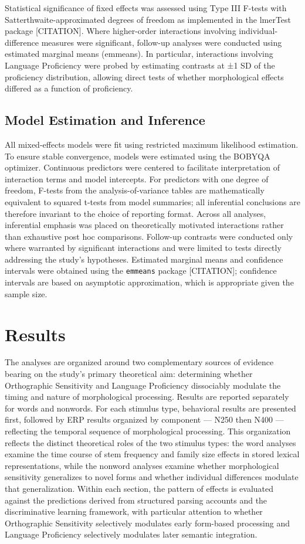 \documentclass[utf8]{FrontiersinHarvard} %
\begin{document}
Statistical significance of fixed effects was assessed using Type III F-tests with Satterthwaite-approximated degrees of freedom as implemented in the lmerTest package [CITATION]. Where higher-order interactions involving individual-difference measures were significant, follow-up analyses were conducted using estimated marginal means (emmeans). In particular, interactions involving Language Proficiency were probed by estimating contrasts at ±1 SD of the proficiency distribution, allowing direct tests of whether morphological effects differed as a function of proficiency.

\subsection{Model Estimation and Inference}
All mixed-effects models were fit using restricted maximum likelihood estimation. To ensure stable convergence, models were estimated using the BOBYQA optimizer. Continuous predictors were centered to facilitate interpretation of interaction terms and model intercepts. For predictors with one degree of freedom, F-tests from the analysis-of-variance tables are mathematically equivalent to squared t-tests from model summaries; all inferential conclusions are therefore invariant to the choice of reporting format. Across all analyses, inferential emphasis was placed on theoretically motivated interactions rather than exhaustive post hoc comparisons. Follow-up contrasts were conducted only where warranted by significant interactions and were limited to tests directly addressing the study’s hypotheses. Estimated marginal means and confidence intervals were obtained using the \texttt{emmeans} package [CITATION]; confidence intervals are based on asymptotic approximation, which is appropriate given the sample size.

\section{Results}

The analyses are organized around two complementary sources of evidence bearing on the study's primary theoretical aim: determining whether Orthographic Sensitivity and Language Proficiency dissociably modulate the timing and nature of morphological processing. Results are reported separately for words and nonwords. For each stimulus type, behavioral results are presented first, followed by ERP results organized by component — N250 then N400 — reflecting the temporal sequence of morphological processing. This organization reflects the distinct theoretical roles of the two stimulus types: the word analyses examine the time course of stem frequency and family size effects in stored lexical representations, while the nonword analyses examine whether morphological sensitivity generalizes to novel forms and whether individual differences modulate that generalization. Within each section, the pattern of effects is evaluated against the predictions derived from structured parsing accounts and the discriminative learning framework, with particular attention to whether Orthographic Sensitivity selectively modulates early form-based processing and Language Proficiency selectively modulates later semantic integration.
\end{document}
